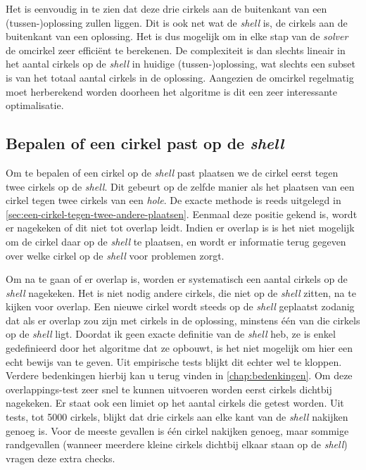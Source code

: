 \documentclass[12pt,a4paper,oneside]{book}
\begin{document}
Het is eenvoudig in te zien dat deze drie cirkels aan de buitenkant van een (tussen-)oplossing zullen liggen.
Dit is ook net wat de \textit{shell} is, de cirkels aan de buitenkant van een oplossing.
Het is dus mogelijk om in elke stap van de \textit{solver} de omcirkel zeer efficiënt te berekenen.
De complexiteit is dan slechts lineair in het aantal cirkels op de \textit{shell} in huidige (tussen-)oplossing, wat slechts een subset is van het totaal aantal cirkels in de oplossing.
Aangezien de omcirkel regelmatig moet herberekend worden doorheen het algoritme is dit een zeer interessante optimalisatie.

\subsection{Bepalen of een cirkel past op de \textit{shell}} \label{sec:bepalen-of-een-cirkel-past-op-de-shell}

Om te bepalen of een cirkel op de \textit{shell} past plaatsen we de cirkel eerst tegen twee cirkels op de \textit{shell}.
Dit gebeurt op de zelfde manier als het plaatsen van een cirkel tegen twee cirkels van een \textit{hole}.
De exacte methode is reeds uitgelegd in \autoref{sec:een-cirkel-tegen-twee-andere-plaatsen}.
Eenmaal deze positie gekend is, wordt er nagekeken of dit niet tot overlap leidt.
Indien er overlap is is het niet mogelijk om de cirkel daar op de \textit{shell} te plaatsen, en wordt er informatie terug gegeven over welke cirkel op de \textit{shell} voor problemen zorgt.

Om na te gaan of er overlap is, worden er systematisch een aantal cirkels op de \textit{shell} nagekeken.
Het is niet nodig andere cirkels, die niet op de \textit{shell} zitten, na te kijken voor overlap.
Een nieuwe cirkel wordt steeds op de \textit{shell} geplaatst zodanig dat als er overlap zou zijn met cirkels in de oplossing, minstens één van die cirkels op de \textit{shell} ligt.
Doordat ik geen exacte definitie van de \textit{shell} heb, ze is enkel gedefinieerd door het algoritme dat ze opbouwt, is het niet mogelijk om hier een echt bewijs van te geven.
Uit empirische tests blijkt dit echter wel te kloppen.
Verdere bedenkingen hierbij kan u terug vinden in \autoref{chap:bedenkingen}.
Om deze overlappings-test zeer snel te kunnen uitvoeren worden eerst cirkels dichtbij nagekeken.
Er staat ook een limiet op het aantal cirkels die getest worden.
Uit tests, tot 5000 cirkels, blijkt dat drie cirkels aan elke kant van de \textit{shell} nakijken genoeg is.
Voor de meeste gevallen is één cirkel nakijken genoeg, maar sommige randgevallen (wanneer meerdere kleine cirkels dichtbij elkaar staan op de \textit{shell}) vragen deze extra checks.
\end{document}
